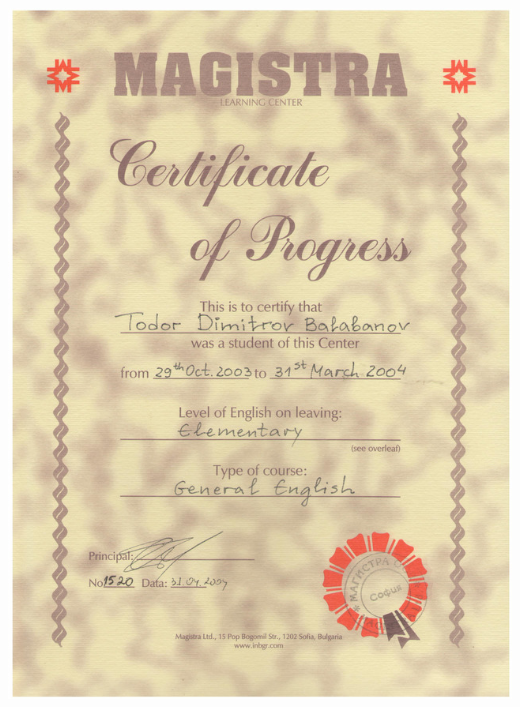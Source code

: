 \documentclass[bulgarian,a4paper]{europasscv}
\begin{document}
\includegraphics[width=\textwidth,height=\textheight,keepaspectratio]{Magistra2004}
\end{document}
